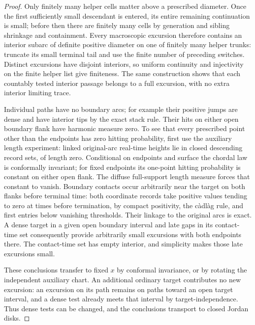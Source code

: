 \begin{proof}
Only finitely many helper cells matter above a prescribed diameter.  Once the first sufficiently small descendant is entered, its entire remaining continuation is small; before then there are finitely many cells by generation and sibling shrinkage and containment.  Every macroscopic excursion therefore contains an interior subarc of definite positive diameter on one of finitely many helper trunks: truncate its small terminal tail and use the finite number of preceding switches.  Distinct excursions have disjoint interiors, so uniform continuity and injectivity on the finite helper list give finiteness.  The same construction shows that each countably tested interior passage belongs to a full excursion, with no extra interior limiting trace.

Individual paths have no boundary arcs; for example their positive jumps are dense and have interior tips by the exact stack rule.  Their hits on either open boundary flank have harmonic measure zero.  To see that every prescribed point other than the endpoints has zero hitting probability, first use the auxiliary length experiment: linked original-arc real-time heights lie in closed descending record sets, of length zero.  Conditional on endpoints and surface the chordal law is conformally invariant; for fixed endpoints its one-point hitting probability is constant on either open flank.  The diffuse full-support length measure forces that constant to vanish.  Boundary contacts occur arbitrarily near the target on both flanks before terminal time: both coordinate records take positive values tending to zero at times before termination, by compact positivity, the c\`adl\`ag rule, and first entries below vanishing thresholds.  Their linkage to the original arcs is exact.  A dense target in a given open boundary interval and late gaps in its contact-time set consequently provide arbitrarily small excursions with both endpoints there.  The contact-time set has empty interior, and simplicity makes those late excursions small.

These conclusions transfer to fixed $x$ by conformal invariance, or by rotating the independent auxiliary chart.  An additional ordinary target contributes no new excursion: an excursion on its path remains on paths toward an open target interval, and a dense test already meets that interval by target-independence.  Thus dense tests can be changed, and the conclusions transport to closed Jordan disks.


\end{proof}
